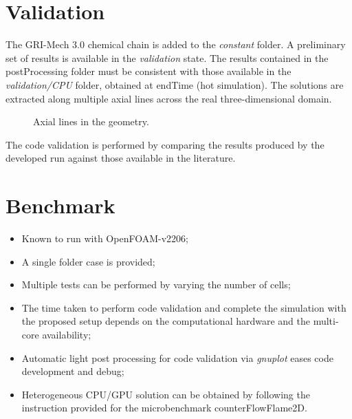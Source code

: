 \section*{Validation}
The GRI-Mech 3.0 chemical chain is added to the \textit{constant} folder. A preliminary set of results is available in the \textit{validation} state. The results contained in the postProcessing folder must be consistent with those available in the \textit{validation/CPU} folder, obtained at endTime (hot simulation). The solutions are extracted along multiple axial lines across the real three-dimensional domain.

\begin{figure}[h]
    \centering
    \caption{Axial lines in the geometry.}
\end{figure}

The code validation is performed by comparing the results produced by the developed run against those available in the literature.

\section*{Benchmark}
\begin{itemize}
    \item Known to run with OpenFOAM-v2206;
    \item A single folder case is provided;
    \item Multiple tests can be performed by varying the number of cells;
    \item The time taken to perform code validation and complete the simulation with the proposed setup depends on the computational hardware and the multi-core availability;
    \item Automatic light post processing for code validation via \textit{gnuplot} eases code development and debug;
    \item Heterogeneous CPU/GPU solution can be obtained by following the instruction provided for the microbenchmark counterFlowFlame2D.
\end{itemize}